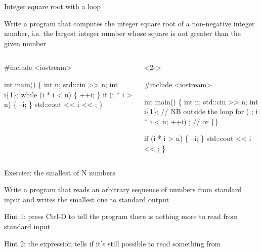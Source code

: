 \begin{frame}[fragile]{Integer square root with a  loop}

  Write a program that computes the integer square root of a non-negative
  integer number, i.e. the largest integer number whose square is not greater
  than the given number

  \begin{columns}[T]
    \begin{column}{.35\textwidth}
      \begin{codeblock}
#include <iostream>

int main()
\{
  int n;
  std::cin >> n;
  int i\{1\};
  while (i * i < n) \{
    ++i;
  \}
  if (i * i > n) \{
    --i;
  \}
  std::cout << i << \bslashn;
\}\end{codeblock}
    \end{column}

    \begin{column}{.65\textwidth}
      \begin{codeblock}<2->{
#include <iostream>

int main()
\{
  int n;
  std::cin >> n;
  int i\{1\};  // NB outside the loop
  for ( ; i * i < n; ++i) ;  // or \{\}


  if (i * i > n) \{
    --i;
  \}
  std::cout << i << \bslashn;
\}}\end{codeblock}
    \end{column}

  \end{columns}

\end{frame}

\begin{frame}{Exercise: the smallest of N numbers}

  Write a program that reads an arbitrary sequence of numbers from standard
  input and writes the smallest one to standard output

  Hint 1: press Ctrl-D to tell the program there is nothing more to read from
  standard input

  Hint 2: the expression  tells if it's still possible to
  read something from 
\end{frame}

